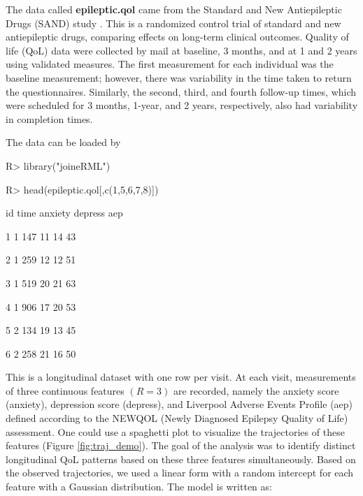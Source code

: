 The data called \textbf{epileptic.qol} came from the Standard and New Antiepileptic Drugs (SAND) study \citep{Marson2007}. This is a randomized control trial of standard and new antiepileptic drugs, comparing effects on long-term clinical outcomes. Quality of life (QoL) data were collected by mail at baseline, 3 months, and at 1 and 2 years using validated measures. The first measurement for each individual was the baseline measurement; however, there was variability in the time taken to return the questionnaires. Similarly, the second, third, and fourth follow-up times, which were scheduled for 3 months, 1-year, and 2 years, respectively, also had variability in completion times. 

The data can be loaded by

\begin{example}

R> library("joineRML")

R> head(epileptic.qol[,c(1,5,6,7,8)])

\end{example}

\begin{example}

  id time anxiety depress aep

1  1  147      11      14  43

2  1  259      12      12  51

3  1  519      20      21  63

4  1  906      17      20  53

5  2  134      19      13  45

6  2  258      21      16  50

\end{example}

This is a longitudinal dataset with one row per visit. At each visit, measurements of three continuous features $(R = 3)$ are recorded, namely the anxiety score (anxiety), depression score (depress), and Liverpool Adverse Events Profile (aep) defined according to the NEWQOL (Newly Diagnosed Epilepsy Quality of Life) assessment. One could use a spaghetti plot to visualize the trajectories of these features (Figure \ref{fig:traj_demo}). The goal of the analysis was to identify distinct longitudinal QoL patterns based on these three features simultaneously. Based on the observed trajectories, we used a linear form with a random intercept for each feature with a Gaussian distribution. The model is written as: 

